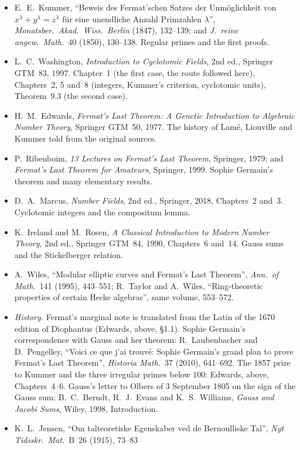 \begin{itemize}
\item E.~E.~Kummer, ``Beweis des Fermat'schen Satzes der Unm\"oglichkeit von $x^\lambda+y^\lambda=z^\lambda$ f\"ur eine unendliche
Anzahl Primzahlen $\lambda$'', \emph{Monatsber.\ Akad.\ Wiss.\ Berlin} (1847), 132--139; and \emph{J.\ reine angew.\ Math.}\ 40
(1850), 130--138. Regular primes and the first proofs.
\item L.~C.~Washington, \emph{Introduction to Cyclotomic Fields}, 2nd ed., Springer GTM~83, 1997. Chapter~1 (the first case, the
route followed here), Chapters~2, 5 and~8 (integers, Kummer's criterion, cyclotomic units), Theorem~9.3 (the second case).
\item H.~M.~Edwards, \emph{Fermat's Last Theorem: A Genetic Introduction to Algebraic Number Theory}, Springer GTM~50, 1977. The
history of Lamé, Liouville and Kummer told from the original sources.
\item P.~Ribenboim, \emph{13 Lectures on Fermat's Last Theorem}, Springer, 1979; and \emph{Fermat's Last Theorem for Amateurs},
Springer, 1999. Sophie Germain's theorem and many elementary results.
\item D.~A.~Marcus, \emph{Number Fields}, 2nd ed., Springer, 2018, Chapters~2 and~3. Cyclotomic integers and the compositum lemma.
\item K.~Ireland and M.~Rosen, \emph{A Classical Introduction to Modern Number Theory}, 2nd ed., Springer GTM~84, 1990,
Chapters~6 and~14. Gauss sums and the Stickelberger relation.
\item A.~Wiles, ``Modular elliptic curves and Fermat's Last Theorem'', \emph{Ann.\ of Math.}\ 141 (1995), 443--551; R.~Taylor and
A.~Wiles, ``Ring-theoretic properties of certain Hecke algebras'', same volume, 553--572.
\item \emph{History.} Fermat's marginal note is translated from the Latin of the 1670 edition of Diophantus (Edwards, above,
\S1.1). Sophie Germain's correspondence with Gauss and her theorem: R.~Laubenbacher and D.~Pengelley, ``Voici ce que j'ai
trouv\'e: Sophie Germain's grand plan to prove Fermat's Last Theorem'', \emph{Historia Math.}\ 37 (2010), 641--692.
The 1857 prize to Kummer and the three irregular primes below $100$: Edwards, above, Chapters~4--6.
Gauss's letter to Olbers of 3 September 1805 on the sign of the Gauss sum: B.~C.~Berndt, R.~J.~Evans and K.~S.~Williams,
\emph{Gauss and Jacobi Sums}, Wiley, 1998, Introduction.
\item K.~L.~Jensen, ``Om talteoretiske Egenskaber ved de Bernoulliske Tal'', \emph{Nyt Tidsskr.\ Mat.}\ B~26 (1915), 73--83

\end{itemize}
